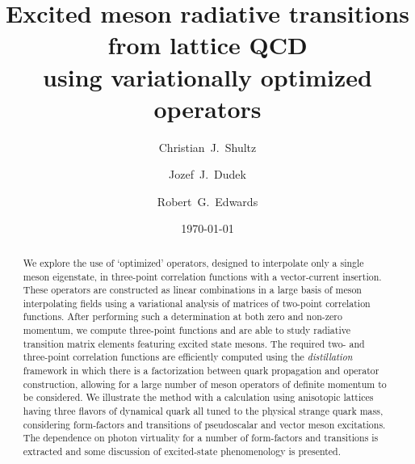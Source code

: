 \documentclass[twocolumn,amsmath,amssymb,prd,10pt,floatfix, 
superscriptaddress,nofootinbib, showpacs, preprintnumbers]{revtex4-1}
\begin{document}

\title{ Excited meson radiative transitions from lattice QCD \\using variationally optimized operators}


 \author{Christian~J.~Shultz}

 \author{Jozef~J.~Dudek}
 

 \author{Robert~G.~Edwards}


\noaffiliation


\date{\today}

\begin{abstract}
We explore the use of `optimized' operators, designed to interpolate only a single meson eigenstate, in three-point correlation functions with a vector-current insertion. These operators are constructed as linear combinations in a large basis of meson interpolating fields using a variational analysis of matrices of two-point correlation functions. After performing such a determination at both zero and non-zero momentum, we compute three-point functions and are able to study radiative transition matrix elements featuring excited state mesons. The required two- and three-point correlation functions are efficiently computed using the \emph{distillation} framework in which there is a factorization between quark propagation and operator construction, allowing for a large number of meson operators of definite momentum to be considered. We illustrate the method with a calculation using anisotopic lattices having three flavors of dynamical quark all tuned to the physical strange quark mass, considering form-factors and transitions of pseudoscalar and vector meson excitations. The dependence on photon virtuality for a number of form-factors and transitions is extracted and some discussion of excited-state phenomenology is presented.
\end{abstract}

\maketitle
\end{document}
